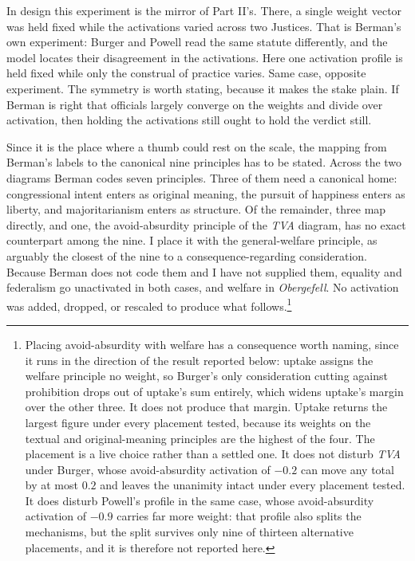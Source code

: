 In design this experiment is the mirror of Part II's. There, a single weight vector
was held fixed while the activations varied across two Justices. That is
Berman's own experiment: Burger and Powell read the same statute
differently, and the model locates their disagreement in the
activations. Here one activation profile is held fixed while only the
construal of practice varies. Same case, opposite experiment. The symmetry is worth stating, because it makes the stake plain. If Berman is
right that officials largely converge on the weights and divide over
activation, then holding the activations still ought to hold the verdict
still.

Since it is the place where a thumb could rest on the scale, the mapping from
Berman's labels to the canonical nine principles has to be stated.
Across the two diagrams Berman codes seven principles. Three of them need a
canonical home: congressional intent enters as original meaning, the
pursuit of happiness enters as liberty, and majoritarianism enters as
structure. Of the remainder, three map directly, and one, the avoid-absurdity
principle of the \textit{TVA} diagram, has no exact counterpart among the
nine. I place it with the general-welfare principle, as arguably the
closest of the nine to a consequence-regarding consideration. Because Berman does not code them and I have not supplied them, equality
and federalism go unactivated in both cases, and welfare in
\textit{Obergefell}. No activation was
added, dropped, or rescaled to produce what follows.\footnote{Placing
avoid-absurdity with welfare has a consequence worth naming, since it
runs in the direction of the result reported below: uptake assigns the welfare
principle no weight, so Burger's only consideration cutting against
prohibition drops out of uptake's sum entirely, which widens uptake's margin
over the other three. It does not produce that margin. Uptake returns the
largest figure under every placement tested, because its weights on the
textual and original-meaning principles are the highest of the four. The placement is a live
choice rather than a settled one. It does not disturb \textit{TVA} under
Burger, whose avoid-absurdity activation of $-0.2$ can move any total by
at most $0.2$ and leaves the unanimity intact under every placement
tested. It does disturb Powell's profile in the same case, whose
avoid-absurdity activation of $-0.9$ carries far more weight: that
profile also splits the mechanisms, but the split survives only nine of
thirteen alternative placements, and it is therefore not reported here.}

